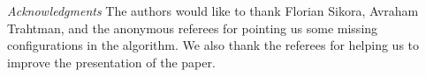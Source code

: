 \documentclass[11pt,a4paper]{article}
\begin{document}
\noindent \emph{Acknowledgments} The authors would like to thank
Florian Sikora, Avraham Trahtman, and the anonymous referees for 
pointing us some missing configurations in the algorithm.
We also thank the referees for helping us to improve the presentation
of the paper.



\end{document}
